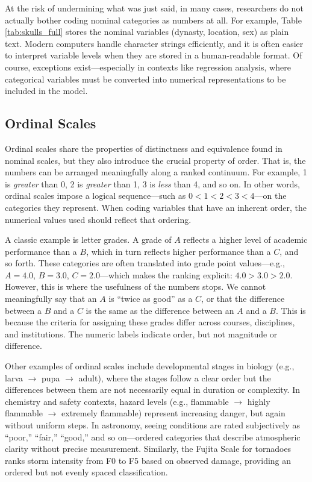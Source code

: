 At the risk of undermining what was just said, in many cases, researchers do not actually bother coding nominal categories as numbers at all. For example, Table \ref{tab:skulls_full} stores the nominal variables (dynasty, location, sex) as plain text. Modern computers handle character strings efficiently, and it is often easier to interpret variable levels when they are stored in a human-readable format. Of course, exceptions exist—especially in contexts like regression analysis, where categorical variables must be converted into numerical representations to be included in the model.

\subsection{Ordinal Scales}

Ordinal scales share the properties of distinctness and equivalence found in nominal scales, but they also introduce the crucial property of order. That is, the numbers can be arranged meaningfully along a ranked continuum. For example,  1 is \textit{greater} than 0, 2 is \textit{greater} than 1, 3 is \textit{less} than 4, and so on. In other words, ordinal scales impose a logical sequence—such as $0 < 1 < 2 < 3 < 4$—on the categories they represent. When coding variables that have an inherent order, the numerical values used should reflect that ordering.

A classic example is letter grades. A grade of $A$ reflects a higher level of academic performance than a $B$, which in turn reflects higher performance than a $C$, and so forth. These categories are often translated into grade point values—e.g., $A = 4.0$, $B = 3.0$, $C = 2.0$—which makes the ranking explicit: $4.0 > 3.0 > 2.0$. However, this is where the usefulness of the numbers stops. We cannot meaningfully say that an $A$ is ``twice as good'' as a $C$, or that the difference between a $B$ and a $C$ is the same as the difference between an $A$ and a $B$. This is because the criteria for assigning these grades differ across courses, disciplines, and institutions. The numeric labels indicate order, but not magnitude or difference.

Other examples of ordinal scales include developmental stages in biology (e.g., larva $\rightarrow$ pupa $\rightarrow$ adult), where the stages follow a clear order but the differences between them are not necessarily equal in duration or complexity. In chemistry and safety contexts, hazard levels (e.g., flammable $\rightarrow$ highly flammable $\rightarrow$ extremely flammable) represent increasing danger, but again without uniform steps. In astronomy, seeing conditions are rated subjectively as ``poor,'' ``fair,'' ``good,'' and so on—ordered categories that describe atmospheric clarity without precise measurement. Similarly, the Fujita Scale for tornadoes ranks storm intensity from F0 to F5 based on observed damage, providing an ordered but not evenly spaced classification.

